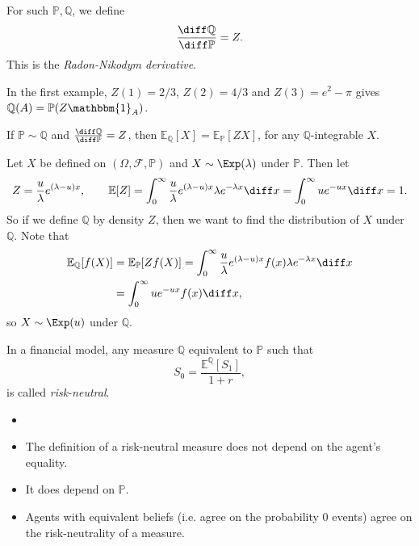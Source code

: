 \documentclass[12pt]{article}
\begin{document}
For such $\mathbb{P}, \mathbb{Q}$, we define
\[
\frac{\diff \mathbb{Q}}{\diff \mathbb{P}} = Z.
\]
This is the \emph{Radon-Nikodym derivative}.

In the first example, $Z(1) = 2/3$, $Z(2) = 4/3$ and $Z(3) = e^2 - \pi$ gives $\mathbb{Q}(A) = \mathbb{P}(Z \mathbbm{1}_{A})$.

\begin{remark}
	If $\mathbb{P} \sim \mathbb{Q}$ and $\frac{\diff \mathbb{Q}}{\diff \mathbb{P}} = Z$, then $\mathbb{E}_{\mathbb{Q}}[X] = \mathbb{E}_{\mathbb{P}}[Z X]$, for any $\mathbb{Q}$-integrable $X$.
\end{remark}

\begin{exbox}
	Let $X$ be defined on $(\Omega, \mathcal{F}, \mathbb{P})$ and $X \sim \Exp(\lambda)$ under $\mathbb{P}$. Then let
	\[
	Z = \frac{u}{\lambda} e^{(\lambda - u)x}, \qquad \mathbb{E}[Z] = \int_0^{\infty} \frac{u}{\lambda} e^{(\lambda - u)x} \lambda e^{-\lambda x} \diff x = \int_0^{\infty} u e^{-u x} \diff x = 1.
	\]
	So if we define $\mathbb{Q}$ by density $Z$, then we want to find the distribution of $X$ under $\mathbb{Q}$. Note that
	\begin{align*}
		\mathbb{E}_{\mathbb{Q}}[f(X)] &= \mathbb{E}_{\mathbb{P}}[Z f(X)] = \int_0^{\infty} \frac{u}{\lambda} e^{(\lambda - u)x} f(x) \lambda e^{-\lambda x} \diff x \\
					      &= \int_0^{\infty} u e^{-u x} f(x) \diff x,
	\end{align*}
	so $X \sim \Exp(u)$ under $\mathbb{Q}$.
\end{exbox}

\begin{definition}
	In a financial model, any measure $\mathbb{Q}$ equivalent to $\mathbb{P}$ such that
	\[
	S_0 = \frac{\mathbb{E}^{\mathbb{Q}}[S_1]}{1 + r},
	\]
	is called \emph{risk-neutral}.
\end{definition}


\begin{remark}
	\begin{itemize}
		\item[]
		\item The definition of a risk-neutral measure does not depend on the agent's equality.
		\item It does depend on $\mathbb{P}$.
		\item Agents with equivalent beliefs (i.e. agree on the probability 0 events) agree on the risk-neutrality of a measure.
	\end{itemize}
\end{remark}
\end{document}
